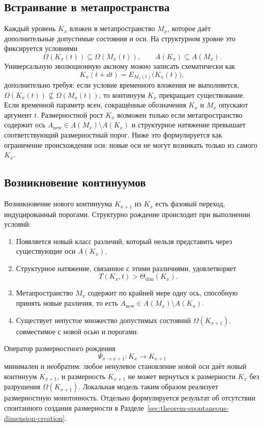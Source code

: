 \subsection{Встраивание в метапространства}

Каждый уровень \(K_x\) вложен в метапространство \(M_x\), которое даёт
дополнительные допустимые состояния и оси.
На структурном уровне это фиксируется условиями
\[
    \Omega(K_x(t)) \subseteq \Omega(M_x(t)), \qquad
    A(K_x) \subseteq A(M_x).
\]
Универсальную эволюционную аксиому можно записать схематически как
\[
    K_x(t+dt) = E_{M_x(t)}\big(K_x(t)\big),
\]
дополнительно требуя: если условие временного вложения не выполняется,
\(\Omega(K_x(t))\not\subseteq\Omega(M_x(t))\), то континуум \(K_x\)
прекращает существование. Если временной параметр ясен, сокращённые обозначения
\(K_x\) и \(M_x\) опускают аргумент \(t\).
Размерностной рост \(K_x\) возможен только если метапространство содержит ось
\(A_{\mathrm{new}}\in A(M_x)\setminus A(K_x)\) и структурное натяжение превышает
соответствующий размерностный порог. Ниже это формулируется как ограничение происхождения
оси: новые оси не могут возникать только из самого \(K_x\).

\subsection{Возникновение континуумов}

Возникновение нового континуума \(K_{x+1}\) из \(K_x\) есть фазовый переход,
индуцированный порогами.
Структурно рождение происходит при выполнении условий:

\begin{enumerate}
    \item Появляется новый класс различий, который нельзя представить через существующие оси \(A(K_x)\).
    \item Структурное натяжение, связанное с этими различиями, удовлетворяет
          \[
              T(K_x,t) > \Theta_{\mathrm{dim}}(K_x).
          \]
    \item Метапространство \(M_x\) содержит по крайней мере одну ось, способную принять новые различия,
          то есть \(A_{\mathrm{new}} \in A(M_x) \setminus A(K_x)\).
    \item Существует непустое множество допустимых состояний \(\Omega(K_{x+1})\), совместимое с новой осью и порогами.
\end{enumerate}

Оператор размерностного рождения
\[
    \Psi_{x\to x+1}: K_x \to K_{x+1}
\]
минимален и необратим: любое ненулевое становление новой оси даёт новый континуум \(K_{x+1}\),
и размерность \(K_{x+1}\) не может вернуться к размерности \(K_x\) без разрушения
\(\Omega(K_{x+1})\).
Локальная модель таким образом реализует размерностную монотонность. Отдельно формулируется
результат об отсутствии спонтанного создания размерности в
Разделе~\ref{sec:theorem-spontaneous-dimension-creation}.

